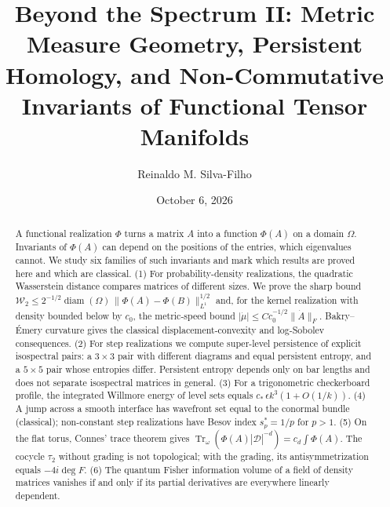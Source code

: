 \documentclass[11pt,a4paper,reqno]{amsart}
\theoremstyle{definition}
\numberwithin{equation}{section}
\newcommand{\Tr}{\operatorname{Tr}}
\newcommand{\diam}{\operatorname{diam}}
\begin{document}
\title[Beyond the Spectrum II]{Beyond the Spectrum II: Metric Measure Geometry, Persistent Homology, and Non-Commutative Invariants of Functional Tensor Manifolds}

\author{Reinaldo M. Silva-Filho}
\address{Master's student, Postgraduate Program in Statistics and Agricultural Experimentation (PPGEE/DES), Department of Statistics (DES), Federal University of Lavras (UFLA), Lavras, MG, Brazil}
\date{October 6, 2026}

\begin{abstract}
A functional realization $\Phi$ turns a matrix $A$ into a function $\Phi(A)$ on a domain $\Omega$. Invariants of $\Phi(A)$ can depend on the positions of the entries, which eigenvalues cannot. We study six families of such invariants and mark which results are proved here and which are classical.
(1) For probability-density realizations, the quadratic Wasserstein distance compares matrices of different sizes. We prove the sharp bound $\mathcal{W}_2 \le 2^{-1/2}\diam(\Omega)\,\|\Phi(A)-\Phi(B)\|_{L^1}^{1/2}$ and, for the kernel realization with density bounded below by $c_0$, the metric-speed bound $|\dot\mu| \le C c_0^{-1/2}\|\dot A\|_F$. Bakry--\'Emery curvature gives the classical displacement-convexity and log-Sobolev consequences.
(2) For step realizations we compute super-level persistence of explicit isospectral pairs: a $3\times 3$ pair with different diagrams and equal persistent entropy, and a $5\times 5$ pair whose entropies differ. Persistent entropy depends only on bar lengths and does not separate isospectral matrices in general.
(3) For a trigonometric checkerboard profile, the integrated Willmore energy of level sets equals $c_*\,\epsilon k^3(1+O(1/k))$.
(4) A jump across a smooth interface has wavefront set equal to the conormal bundle (classical); non-constant step realizations have Besov index $s^*_p = 1/p$ for $p > 1$.
(5) On the flat torus, Connes' trace theorem gives $\Tr_\omega(\Phi(A)|\mathcal{D}|^{-d}) = c_d\int\Phi(A)$. The cocycle $\tau_2$ without grading is not topological; with the grading, its antisymmetrization equals $-4i\deg F$.
(6) The quantum Fisher information volume of a field of density matrices vanishes if and only if its partial derivatives are everywhere linearly dependent.
\end{abstract}

\end{document}
